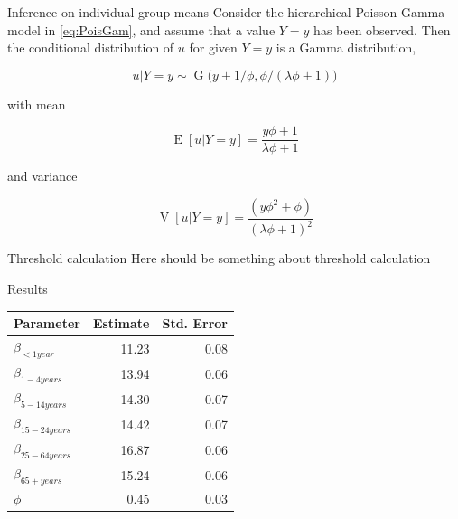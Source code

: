\documentclass[aspectratio=169]{beamer}
\DeclareMathOperator{\E}{E}
\DeclareMathOperator{\V}{V}
\DeclareMathOperator{\G}{G}
\begin{document}
\begin{frame}{Inference on individual group means}
\protect\hypertarget{inference-on-individual-group-means}{}
Consider the hierarchical Poisson-Gamma model in \eqref{eq:PoisGam}, and
assume that a value \(Y=y\) has been observed. Then the conditional
distribution of \(u\) for given \(Y=y\) is a Gamma distribution,

\begin{equation}
  u|Y=y\sim \G\big(y+1/\phi,\phi/(\lambda \phi+1)\big)
\end{equation}

with mean

\begin{equation}
  \E[u|Y=y]=\frac{y\phi+1}{\lambda\phi+1}
\end{equation}

and variance

\begin{equation}
  \V[u|Y=y]=\frac{(y \phi^2+\phi)}{(\lambda \phi + 1)^2}
\end{equation}
\end{frame}

\begin{frame}{Threshold calculation}
\protect\hypertarget{threshold-calculation-1}{}
Here should be something about threshold calculation
\end{frame}

\begin{frame}{Results}
\protect\hypertarget{results-2}{}
\tiny

\begin{table}
\centering\begingroup\fontsize{10}{12}\selectfont

\begin{tabular}{lrr}
\toprule
Parameter & Estimate & Std. Error\\
\midrule
$\beta_{<1 year}$ & 11.23 & 0.08\\
$\beta_{1-4 years}$ & 13.94 & 0.06\\
$\beta_{5-14 years}$ & 14.30 & 0.07\\
$\beta_{15-24 years}$ & 14.42 & 0.07\\
$\beta_{25-64 years}$ & 16.87 & 0.06\\
$\beta_{65+ years}$ & 15.24 & 0.06\\
$\phi$ & 0.45 & 0.03\\
\bottomrule
\end{tabular}
\endgroup{}
\end{table}

\normalsize
\end{frame}
\end{document}
